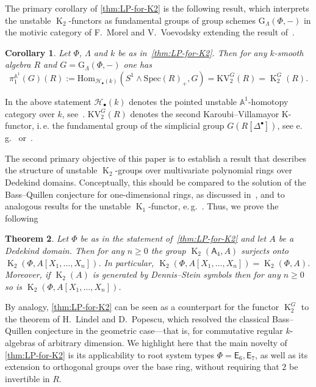 \documentclass[oneside, 10pt]{amsart}
\DeclareMathOperator{\K}{K}
\newcommand{\rA}{\mathsf{A}}
\newcommand{\rE}{\mathsf{E}}
\newtheorem{thm}{Theorem}
\numberwithin{equation}{section}
\numberwithin{thm}{section}
\numberwithin{lemma}{section}
\newtheorem{cor}[thm]{Corollary}
\theoremstyle{definition}
\theoremstyle{remark}
\begin{document}
The primary corollary of \cref{thm:LP-for-K2} is the following result, which interprets the unstable $\K_2$-functors as fundamental groups of group schemes
$\mathrm{G}_\Lambda(\Phi, -)$ in the motivic category of F.~Morel and V.~Voevodsky extending the result of~\cite[Corollary~1.2]{LSV2}.

\begin{cor} \label{cor:motivic-pi1} Let $\Phi$, $\Lambda$ and $k$ be as in~\cref{thm:LP-for-K2}.
Then for any $k$-smooth algebra $R$ and $G = \mathrm{G}_{\Lambda}(\Phi, -)$ one has
\[ \pi_1^{\mathbb{A}^1}(G)(R) := \mathrm{Hom}_{\mathscr{H}_{\bullet}(k)}(S^1 \wedge \mathrm{Spec}(R)_+, G) = \mathrm{KV}_2^{G}(R) = \K_2^G(R).\]
\end{cor}
In the above statement $\mathscr{H}_\bullet(k)$ denotes the pointed unstable $\mathbb{A}^1$-homotopy category over $k$, see~\cite{MV99}.
$\mathrm{KV}_2^{G}(R)$ denotes the second Karoubi--Villamayor K-functor, i.\,e. the fundamental group of
the simplicial group $G(R[\Delta^\bullet])$, see e.\,g.~\cite[\S~3]{Jar83} or~\cite[\S~3.2]{LSV2}.

The second primary objective of this paper is to establish a result that describes the structure of unstable $\K_2$-groups
over multivariate polynomial rings over Dedekind domains.
Conceptually, this should be compared to the solution of the Bass--Quillen conjecture for one-dimensional rings, as discussed in~\cite[\S~V.3]{Lam10},
and to analogous results for the unstable $\K_1$-functor, e.\,g.~\cite[Theorem~1.1]{St-Ded}.
Thus, we prove the following

\begin{thm} \label{cor:dedekind}
Let $\Phi$ be as in the statement of~\cref{thm:LP-for-K2} and let $A$ be a Dedekind domain.
Then for any $n \geq 0$ the group $\K_2(\rA_4, A)$ surjects onto $\K_2(\Phi, A[X_1,\ldots, X_n])$.
In particular, $\K_2(\Phi, A[X_1,\ldots, X_n]) = \K_2(\Phi, A)$.
Moreover, if $\K_2(A)$ is generated by Dennis--Stein symbols then for any $n \geq 0$ so is $\K_2(\Phi, A[X_1,\ldots, X_n])$.
\end{thm}

By analogy, \cref{thm:LP-for-K2} can be seen as a counterpart for the functor $\K_2^G$ to the theorem of H.~Lindel and D.~Popescu,
 which resolved the classical Bass--Quillen conjecture in the geometric case—that is, for commutative regular $k$-algebras of arbitrary dimension.
We highlight here that the main novelty of \cref{thm:LP-for-K2} is its applicability to root system types $\Phi = \rE_6, \rE_7$,
as well as its extension to orthogonal groups over the base ring, without requiring that $2$ be invertible in $R$.
\end{document}
